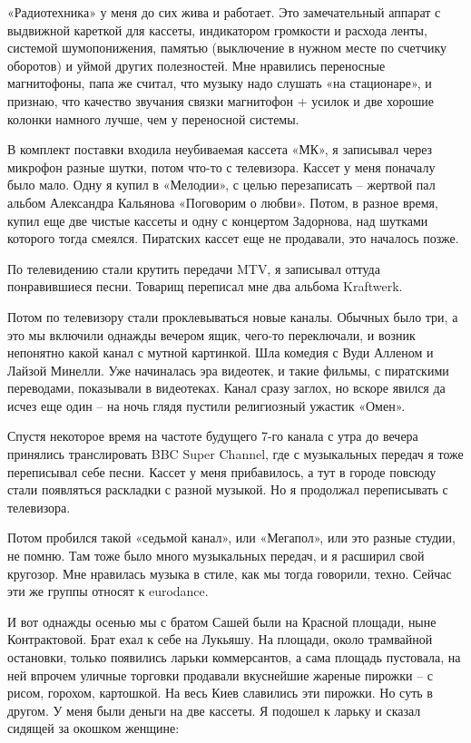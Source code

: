 «Радиотехника» у меня до сих жива и работает. Это замечательный аппарат с выдвижной кареткой для кассеты, индикатором громкости и расхода ленты, системой шумопонижения, памятью (выключение в нужном месте по счетчику оборотов) и уймой других полезностей. Мне нравились переносные магнитофоны, папа же считал, что музыку надо слушать «на стационаре», и признаю, что качество звучания связки магнитофон + усилок и две хорошие колонки намного лучше, чем у переносной системы.

В комплект поставки входила неубиваемая кассета «МК», я записывал через микрофон разные шутки, потом что-то с телевизора. Кассет у меня поначалу было мало. Одну я купил в «Мелодии», с целью перезаписать – жертвой пал альбом Александра Кальянова «Поговорим о любви». Потом, в разное время, купил еще две чистые кассеты и одну с концертом Задорнова, над шутками которого тогда смеялся. Пиратских кассет еще не продавали, это началось позже.

По телевидению стали крутить передачи MTV, я записывал оттуда понравившиеся песни. Товарищ переписал мне два альбома Kraftwerk. 

Потом по телевизору стали проклевываться новые каналы. Обычных было три, а это мы включили однажды вечером ящик, чего-то переключали, и возник непонятно какой канал с мутной картинкой. Шла комедия с Вуди Алленом и Лайзой Минелли. Уже начиналась эра видеотек, и такие фильмы, с пиратскими переводами, показывали в видеотеках. Канал сразу заглох, но вскоре явился да исчез еще один – на ночь глядя пустили религиозный ужастик «Омен». 

Спустя некоторое время на частоте будущего 7-го канала с утра до вечера принялись транслировать BBC Super Channel, где с музыкальных передач я тоже переписывал себе песни. Кассет у меня прибавилось, а тут в городе повсюду стали появляться раскладки с разной музыкой. Но я продолжал переписывать с телевизора.

Потом пробился такой «седьмой канал», или «Мегапол», или это разные студии, не помню. Там тоже было много музыкальных передач, и я расширил свой кругозор. Мне нравилась музыка в стиле, как мы тогда говорили, техно. Сейчас эти же группы относят к eurodance.

И вот однажды осенью мы с братом Сашей были на Красной площади, ныне Контрактовой. Брат ехал к себе на Лукьяшу. На площади, около трамвайной остановки, только появились ларьки коммерсантов, а сама площадь пустовала, на ней впрочем уличные торговки продавали вкуснейшие жареные пирожки – с рисом, горохом, картошкой. На весь Киев славились эти пирожки. Но суть в другом. У меня были деньги на две кассеты. Я подошел к ларьку и сказал сидящей за окошком женщине:

